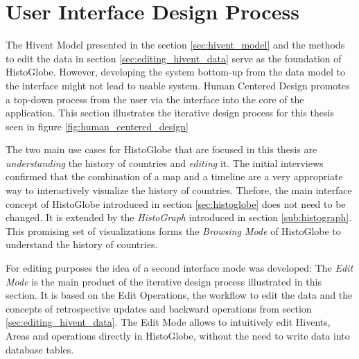 


\section{User Interface Design Process} %
\label{sec:user_interface_design_process}

The Hivent Model presented in the section \ref{sec:hivent_model} and the methods to edit the data in section \ref{sec:editing_hivent_data} serve as the foundation of HistoGlobe. However, developing the system bottom-up from the data model to the interface might not lead to usable system. Human Centered Design promotes a top-down process from the user via the interface into the core of the application. This section illustrates the iterative design process for this thesis seen in figure \ref{fig:human_centered_design}

The two main use cases for HistoGlobe that are focused in this thesis are \emph{understanding} the history of countries and \emph{editing} it. The initial interviews confirmed that the combination of a map and a timeline are a very appropriate way to interactively visualize the history of countries. Thefore, the main interface concept of HistoGlobe introduced in section \ref{sec:histoglobe} does not need to be changed. It is extended by the \emph{HistoGraph} introduced in section \ref{sub:histograph}. This promising set of visualizations forms the \emph{Browsing Mode} of HistoGlobe to understand the history of countries.

For editing purposes the idea of a second interface mode was developed: The \emph{Edit Mode} is the main product of the iterative design process illustrated in this section. It is based on the Edit Operations, the workflow to edit the data and the concepts of retrospective updates and backward operations from section \ref{sec:editing_hivent_data}. The Edit Mode allows to intuitively edit Hivents, Areas and operations directly in HistoGlobe, without the need to write data into database tables.



